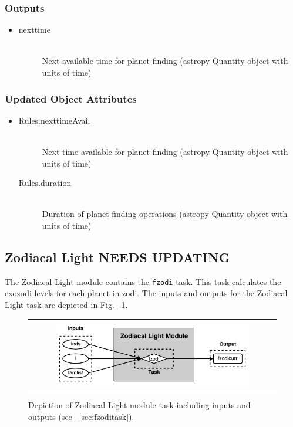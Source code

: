 \documentclass[cleanfoot]{asme2ej}
\begin{document}
\subsubsection*{Outputs}
\begin{itemize}
    \item 
    \begin{description}
        \item[nexttime] \hfill \\
        Next available time for planet-finding (astropy Quantity object with units of time)
    \end{description}
\end{itemize}

\subsubsection*{Updated Object Attributes}
\begin{itemize}
    \item 
    \begin{description}
        \item[Rules.nexttimeAvail] \hfill \\
        Next time available for planet-finding (astropy Quantity object with units of time)
        \item[Rules.duration] \hfill \\
        Duration of planet-finding operations (astropy Quantity object with units of time)
    \end{description}
\end{itemize}


\subsection{Zodiacal Light NEEDS UPDATING}\label{sec:zodiacallight}

The Zodiacal Light module contains the \verb+fzodi+ task.  This task calculates the exozodi levels for each planet in zodi.  The inputs and outputs for the Zodiacal Light task are depicted in Fig. ~\ref{fig:zodiacallightmodule}.

\begin{figure}[ht]
    \begin{center}
        \begin{tabular}{c}
             \includegraphics[width=0.8\textwidth]{ZodiTasks}
        \end{tabular}
    \end{center}
    \caption{\label{fig:zodiacallightmodule} Depiction of Zodiacal Light module task including inputs and outputs (see ~\ref{sec:fzoditask}).}
\end{figure}
\end{document}
